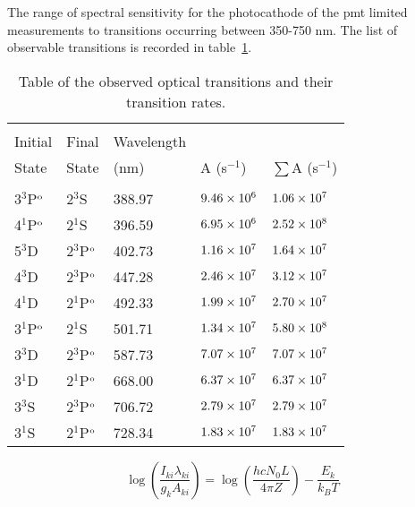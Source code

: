 The range of spectral sensitivity for the photocathode of the \acs{pmt} limited
measurements to transitions occurring between 350-750 nm. The list of observable
transitions is recorded in table~\ref{tbl:transitions}.
\begin{table}
  \centering
  \caption{Table of the observed optical transitions and their transition
    rates.}
  \begin{tabular}{lllll}
    \toprule                                                                    \\
    Initial      & Final        & Wavelength &              &                   \\
    State        & State        & (nm)       & A (s$^{-1}$) & $\sum$A (s$^{-1}$)\\
    \midrule                                                                    \\
    3$^3$P$^\mathrm{o}$ & 2$^3$S       & 388.97     & $9.46\times10^6$   & $1.06\times10^7$        \\
    4$^1$P$^\mathrm{o}$ & 2$^1$S       & 396.59     & $6.95\times10^6$   & $2.52\times10^8$        \\
    5$^3$D       & 2$^3$P$^\mathrm{o}$ & 402.73     & $1.16\times10^7$   & $1.64\times10^7$        \\
    4$^3$D       & 2$^3$P$^\mathrm{o}$ & 447.28     & $2.46\times10^7$   & $3.12\times10^7$        \\
    4$^1$D       & 2$^1$P$^\mathrm{o}$ & 492.33     & $1.99\times10^7$   & $2.70\times10^7$        \\
    3$^1$P$^\mathrm{o}$ & 2$^1$S       & 501.71     & $1.34\times10^7$   & $5.80\times10^8$        \\
    3$^3$D       & 2$^3$P$^\mathrm{o}$ & 587.73     & $7.07\times10^7$   & $7.07\times10^7$        \\
    3$^1$D       & 2$^1$P$^\mathrm{o}$ & 668.00     & $6.37\times10^7$   & $6.37\times10^7$        \\
    3$^3$S       & 2$^3$P$^\mathrm{o}$ & 706.72     & $2.79\times10^7$   & $2.79\times10^7$        \\
    3$^1$S       & 2$^1$P$^\mathrm{o}$ & 728.34     & $1.83\times10^7$   & $1.83\times10^7$        \\
  \end{tabular}
  \label{tbl:transitions}
\end{table}

\begin{equation}
  \log\left(\frac{I_{ki}\lambda_{ki}}{g_kA_{ki}}\right)
  = \log\left(\frac{hcN_0L}{4\pi Z}\right) - \frac{E_k}{k_BT}
\end{equation}


